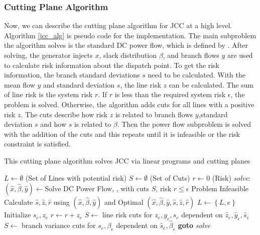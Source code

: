 \subsubsection*{Cutting Plane Algorithm}
Now, we can describe the cutting plane algorithm for JCC at a high level. Algorithm \ref{jcc_alg} is pseudo code for the implementation.  The main subproblem the algorithm solves is the standard DC power flow, which is defined by  .  After solving, the generator injects $x$, slack distribution $\beta$, and branch flows $y$ are used to calculate risk information about the dispatch point.  To get the risk information, the branch standard deviations $s$ need to be calculated.  With the mean flow $y$ and standard deviation $s$, the line risk $z$ can be calculated.  The sum of line risk is the system risk $r$.  If $r$ is less than the required system risk $\epsilon$, the problem is solved.  Otherwise, the algorithm adds cuts for all lines with a positive risk $z$.  The cuts describe how risk $z$ is related to branch flows $y$,standard deviation $s$ and how $s$ is related to $\beta$.  Then the power flow subproblem is solved with the addition of the cuts and this repeats until it is infeasible or the risk constraint is satisfied.
\begin{algorithm}
\caption[Cutting plane algorithm for joint chance constraint model]{This cutting plane algorithm solves JCC  via linear programs and cutting planes}\label{jcc_alg}
\begin{algorithmic}
\State $L \gets \emptyset$  (Set of Lines with potential risk)
\State $S \gets \emptyset$  (Set of Cuts)
\State $r \gets 0$ (Risk)
\BState \emph{solve}:
\State $(\hat{x},\hat{\beta},\hat{y}) \gets $Solve DC Power Flow, , with cuts $S$, risk $r\leq\epsilon$
 \Return Problem Infeasible 
\EndIf
\State Calculate $\hat{s},\hat{z},\hat{r}$ using $(\hat{x},\hat{\beta},\hat{y})$ and 
 \Return Optimal $(\hat{x},\hat{\beta},\hat{y},\hat{s},\hat{z},\hat{r})$
\EndIf
{}
            \State $L \gets \left\{L,e\right\}$
            \State Initialize $s_e,z_e$
            \State $r \gets r + z_e$
    \EndIf            
    \State $S \gets$ line risk cuts  for $z_e,y_e,s_e$ dependent on $\hat{z}_e,\hat{y}_e,\hat{s}_e$
    \State $S \gets$ branch variance cuts  for $s_e,\beta_e$ dependent on $\hat{s}_e,\hat{\beta}_e$
\EndIf
\EndFor
\State \textbf{goto} \emph{solve}
\EndProcedure
\end{algorithmic}
\end{algorithm}





